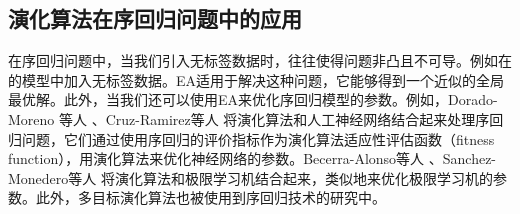 \subsection{演化算法在序回归问题中的应用}

在序回归问题中，当我们引入无标签数据时，往往使得问题非凸且不可导。例如在\citep{chu2005new}\citep{sun2010kernel}的模型中加入无标签数据。EA适用于解决这种问题，它能够得到一个近似的全局最优解。此外，当我们还可以使用EA来优化序回归模型的参数。例如，Dorado-Moreno 等人\citep{dorado2012ordinal}
、Cruz-Ramirez等人\citep{cruz2014metrics}\citep{cruz2013multiobjective}
将演化算法和人工神经网络结合起来处理序回归问题，它们通过使用序回归的评价指标作为演化算法适应性评估函数（fitness function），用演化算法来优化神经网络的参数。Becerra-Alonso等人\citep{becerra2012evolutionary}
、Sanchez-Monedero等人\citep{sanchez2013evolutionary}
将演化算法和极限学习机结合起来，类似地来优化极限学习机的参数。此外，多目标演化算法\citep{deb2001multi}也被使用到序回归技术的研究中\citep{cruz2013multiobjective}\citep{cruz2014metrics}。



